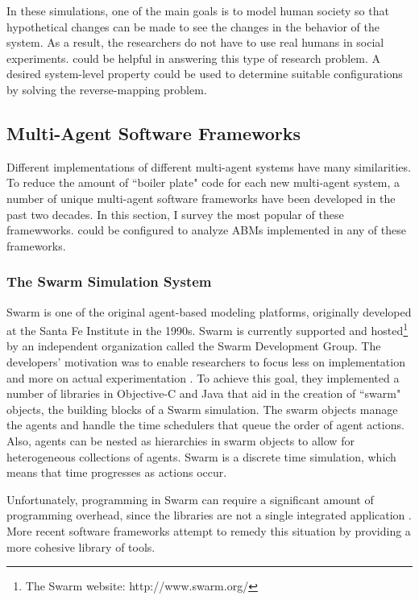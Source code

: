 In these simulations, one of the main goals is to model human society so that hypothetical changes can be made to see the changes in the behavior of the system.
As a result, the researchers do not have to use real humans in social experiments.
\fw could be helpful in answering this type of research problem.
A desired system-level property could be used to determine suitable configurations by solving the reverse-mapping problem.



\subsection{Multi-Agent Software Frameworks}
Different implementations of different multi-agent systems have many similarities.
To reduce the amount of ``boiler plate" code for each new multi-agent system, a number of unique multi-agent software frameworks have been developed in the past two decades.
In this section, I survey the most popular of these framewworks.
\fw could be configured to analyze ABMs implemented in any of these frameworks.

\subsubsection{The Swarm Simulation System}
Swarm is one of the original agent-based modeling platforms, originally developed at the Santa Fe Institute in the 1990s.
Swarm is currently supported and hosted\footnote{The Swarm website: http://www.swarm.org/} by an independent organization called the Swarm Development Group.
The developers' motivation was to enable researchers to focus less on implementation and more on actual experimentation \cite{minar1996swarm}.
To achieve this goal, they implemented a number of libraries in Objective-C and Java that aid in the creation of ``swarm" objects, the building blocks of a Swarm simulation.
The swarm objects manage the agents and handle the time schedulers that queue the order of agent actions.
Also, agents can be nested as hierarchies in swarm objects to allow for heterogeneous collections of agents.
Swarm is a discrete time simulation, which means that time progresses as actions occur.

Unfortunately, programming in Swarm can require a significant amount of programming overhead, since the libraries are not a single integrated application \cite{kleinbreve}.
More recent software frameworks attempt to remedy this situation by providing a more cohesive library of tools.



